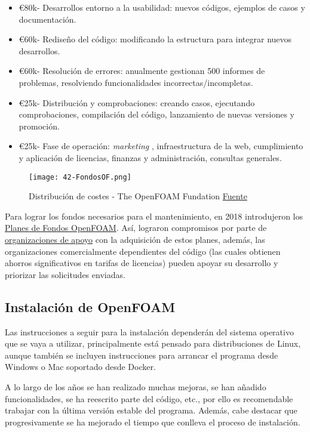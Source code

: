 \begin{itemize}
\item
  \euro{}80k- Desarrollos entorno a la usabilidad: nuevos códigos,
  ejemplos de casos y documentación.
\item
  \euro{}60k- Rediseño del código: modificando la estructura para
  integrar nuevos desarrollos.
\item
  \euro{}60k- Resolución de errores: anualmente gestionan 500 informes
  de problemas, resolviendo funcionalidades incorrectas/incompletas.
\item
  \euro{}25k- Distribución y comprobaciones: creando casos, ejecutando
  comprobaciones, compilación del código, lanzamiento de nuevas
  versiones y promoción.
\item
  \euro{}25k- Fase de operación: \emph{marketing} , infraestructura de
  la web, cumplimiento y aplicación de licencias, finanzas y
  administración, consultas generales.
\end{itemize}

\begin{figure}
\centering
\texttt{[image: 42-FondosOF.png]}
\caption[Distribución de costes]{Distribución de costes - The OpenFOAM Fundation \href{https://openfoam.org/news/funding-2018/}{Fuente}}
\end{figure}

Para lograr los fondos necesarios para el mantenimiento, en 2018
introdujeron los \href{https://openfoam.org/maintenance/}{Planes de
Fondos OpenFOAM}. Así, lograron compromisos por parte de
\href{https://openfoam.org/supporters/}{organizaciones de apoyo} con la
adquisición de estos planes, además, las organizaciones comercialmente
dependientes del código (las cuales obtienen ahorros significativos en
tarifas de licencias) pueden apoyar su desarrollo y priorizar las
solicitudes enviadas.

\subsection{Instalación de OpenFOAM}\label{header-n91}

Las instrucciones a seguir para la instalación dependerán del sistema
operativo que se vaya a utilizar, principalmente está pensado para
distribuciones de Linux, aunque también se incluyen instrucciones para
arrancar el programa desde Windows o Mac soportado desde Docker.

A lo largo de los años se han realizado muchas mejoras, se han añadido
funcionalidades, se ha reescrito parte del código, etc., por ello es
recomendable trabajar con la última versión estable del programa.
Además, cabe destacar que progresivamente se ha mejorado el tiempo que
conlleva el proceso de instalación.

